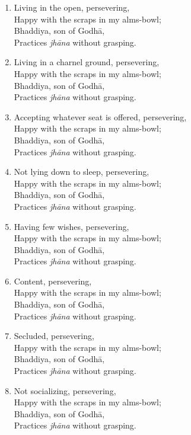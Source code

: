 \documentclass[10pt, openany]{book}
\begin{document}
\begin{enumerate}
\item Living in the open, persevering,\\
Happy with the scraps in my alms-bowl;\\
Bhaddiya, son of Godhā,\\
Practices \emph{jhāna} without grasping.

\item Living in a charnel ground, persevering,\\
Happy with the scraps in my alms-bowl;\\
Bhaddiya, son of Godhā,\\
Practices \emph{jhāna} without grasping.

\item Accepting whatever seat is offered, persevering,\\
Happy with the scraps in my alms-bowl;\\
Bhaddiya, son of Godhā,\\
Practices \emph{jhāna} without grasping.

\item Not lying down to sleep, persevering,\\
Happy with the scraps in my alms-bowl;\\
Bhaddiya, son of Godhā,\\
Practices \emph{jhāna} without grasping.

\item Having few wishes, persevering,\\
Happy with the scraps in my alms-bowl;\\
Bhaddiya, son of Godhā,\\
Practices \emph{jhāna} without grasping.

\item Content, persevering,\\
Happy with the scraps in my alms-bowl;\\
Bhaddiya, son of Godhā,\\
Practices \emph{jhāna} without grasping.

\item Secluded, persevering,\\
Happy with the scraps in my alms-bowl;\\
Bhaddiya, son of Godhā,\\
Practices \emph{jhāna} without grasping.

\item Not socializing, persevering,\\
Happy with the scraps in my alms-bowl;\\
Bhaddiya, son of Godhā,\\
Practices \emph{jhāna} without grasping.


\end{enumerate}
\end{document}
